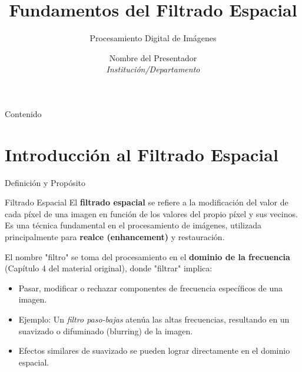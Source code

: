 \documentclass[10pt]{beamer}
\title[Filtrado Espacial]{Fundamentos del Filtrado Espacial}
\subtitle{Procesamiento Digital de Imágenes}
\author[Tu Nombre/Institución]{Nombre del Presentador \\ \textit{Institución/Departamento}}
\institute[] %
\begin{document}
\begin{frame}
\titlepage
\end{frame}

\begin{frame}{Contenido}
\tableofcontents
\end{frame}

\section{Introducción al Filtrado Espacial}

\begin{frame}{Definición y Propósito}
\begin{block}{Filtrado Espacial}
El \textbf{filtrado espacial} se refiere a la modificación del valor de cada píxel de una imagen en función de los valores del propio píxel y sus vecinos.
\vspace{0.1cm}
Es una técnica fundamental en el procesamiento de imágenes, utilizada principalmente para \textbf{realce (enhancement)} y restauración.
\end{block}
\vspace{0.1cm}
El nombre "filtro" se toma del procesamiento en el \textbf{dominio de la frecuencia} (Capítulo 4 del material original), donde "filtrar" implica:
\begin{itemize}
\item Pasar, modificar o rechazar componentes de frecuencia específicos de una imagen.
\item Ejemplo: Un \textit{filtro paso-bajas} atenúa las altas frecuencias, resultando en un suavizado o difuminado (blurring) de la imagen.
\item Efectos similares de suavizado se pueden lograr directamente en el dominio espacial.
\end{itemize}
\end{frame}
\end{document}
